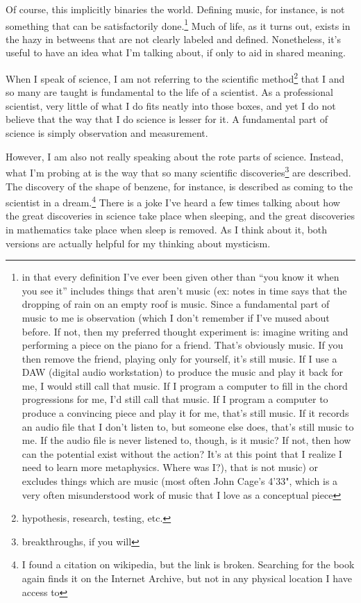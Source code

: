 \documentclass[12pt]{article}[titlepage]
\newcommand{\say}[1]{``#1''}
\renewcommand{\,}{\textsuperscript{,}}
\begin{document}
Of course, this implicitly binaries the world.
Defining music, for instance, is not something that can be satisfactorily done.\footnote{in that every definition I've ever been given other than \say{you know it when you see it} includes things that aren't music (ex: notes in time says that the dropping of rain on an empty roof is music. Since a fundamental part of music to me is observation (which I don't remember if I've mused about before. If not, then my preferred thought experiment is: imagine writing and performing a piece on the piano for a friend. That's obviously music. If you then remove the friend, playing only for yourself, it's still music. If I use a DAW (digital audio workstation) to produce the music and play it back for me, I would still call that music. If I program a computer to fill in the chord progressions for me, I'd still call that music. If I program a computer to produce a convincing piece and play it for me, that's still music. If it records an audio file that I don't listen to, but someone else does, that's still music to me. If the audio file is never listened to, though, is it music? If not, then how can the potential exist without the action? It's at this point that I realize I need to learn more metaphysics. Where was I?), that is not music) or excludes things which are music (most often John Cage's 4'33", which is a very often misunderstood work of music that I love as a conceptual piece}
Much of life, as it turns out, exists in the hazy in betweens that are not clearly labeled and defined.
Nonetheless, it's useful to have an idea what I'm talking about, if only to aid in shared meaning.

When I speak of science, I am not referring to the scientific method\footnote{hypothesis, research, testing, etc.} that I and so many are taught is fundamental to the life of a scientist.
As a professional scientist, very little of what I do fits neatly into those boxes, and yet I do not believe that the way that I do science is lesser for it.
A fundamental part of science is simply observation and measurement.

However, I am also not really speaking about the rote parts of science.
Instead, what I'm probing at is the way that so many scientific discoveries\footnote{breakthroughs, if you will} are described.
The discovery of the shape of benzene, for instance, is described as coming to the scientist in a dream.\footnote{I found a citation on wikipedia, but the link is broken. Searching for the book again finds it on the Internet Archive, but not in any physical location I have access to}
There is a joke I've heard a few times talking about how the great discoveries in science take place when sleeping, and the great discoveries in mathematics take place when sleep is removed.
As I think about it, both versions are actually helpful for my thinking about mysticism.
\end{document}
